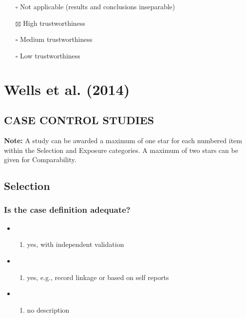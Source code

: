 \documentclass[
  doc, a4paper]{apa7}
\providecommand{\tightlist}{%
  \setlength{\itemsep}{0pt}\setlength{\parskip}{0pt}}
\begin{document}
\begin{itemize}
\tightlist
\item[$\square$]
  Not applicable (results and conclusions inseparable)
\item[$\boxtimes$]
  High trustworthiness
\item[$\square$]
  Medium trustworthiness
\item[$\square$]
  Low trustworthiness
\end{itemize}

\section{Wells et al. (2014)}\label{wellsnewcastleottawascalenos2014}

\subsection{\texorpdfstring{\textbf{CASE CONTROL STUDIES}}{CASE CONTROL STUDIES}}\label{case-control-studies}

\textbf{Note:} A study can be awarded a maximum of one star for each numbered item within the Selection and Exposure categories. A maximum of two stars can be given for Comparability.

\subsection{Selection}\label{selection}

\subsubsection{Is the case definition adequate?}\label{is-the-case-definition-adequate}

\begin{itemize}
\tightlist
\item
  \begin{enumerate}
  \def\labelenumi{\alph{enumi})}
  \tightlist
  \item
    yes, with independent validation
  \end{enumerate}
\item
  \begin{enumerate}
  \def\labelenumi{\alph{enumi})}
  \setcounter{enumi}{1}
  \tightlist
  \item
    yes, e.g., record linkage or based on self reports
  \end{enumerate}
\item
  \begin{enumerate}
  \def\labelenumi{\alph{enumi})}
  \setcounter{enumi}{2}
  \tightlist
  \item
    no description
  \end{enumerate}
\end{itemize}
\end{document}
